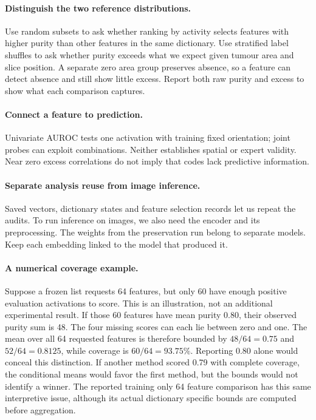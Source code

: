\documentclass[letterpaper]{article}
\begin{document}
\paragraph{Distinguish the two reference distributions.}
Use random subsets to ask whether ranking by activity selects features with higher purity than other features in the same dictionary. Use stratified label shuffles to ask whether purity exceeds what we expect given tumour area and slice position. A separate zero area group preserves absence, so a feature can detect absence and still show little excess. Report both raw purity and excess to show what each comparison captures.

\paragraph{Connect a feature to prediction.}
Univariate AUROC tests one activation with training fixed orientation; joint probes can exploit combinations. Neither establishes spatial or expert validity. Near zero excess correlations do not imply that codes lack predictive information.

\paragraph{Separate analysis reuse from image inference.}
Saved vectors, dictionary states and feature selection records let us repeat the audits. To run inference on images, we also need the encoder and its preprocessing. The weights from the preservation run belong to separate models. Keep each embedding linked to the model that produced it.

\paragraph{A numerical coverage example.}
Suppose a frozen list requests 64 features, but only 60 have enough positive evaluation activations to score. This is an illustration, not an additional experimental result. If those 60 features have mean purity 0.80, their observed purity sum is 48. The four missing scores can each lie between zero and one. The mean over all 64 requested features is therefore bounded by $48/64=0.75$ and $52/64=0.8125$, while coverage is $60/64=93.75\%$. Reporting 0.80 alone would conceal this distinction. If another method scored 0.79 with complete coverage, the conditional means would favor the first method, but the bounds would not identify a winner. The reported training only 64 feature comparison has this same interpretive issue, although its actual dictionary specific bounds are computed before aggregation.
\end{document}
